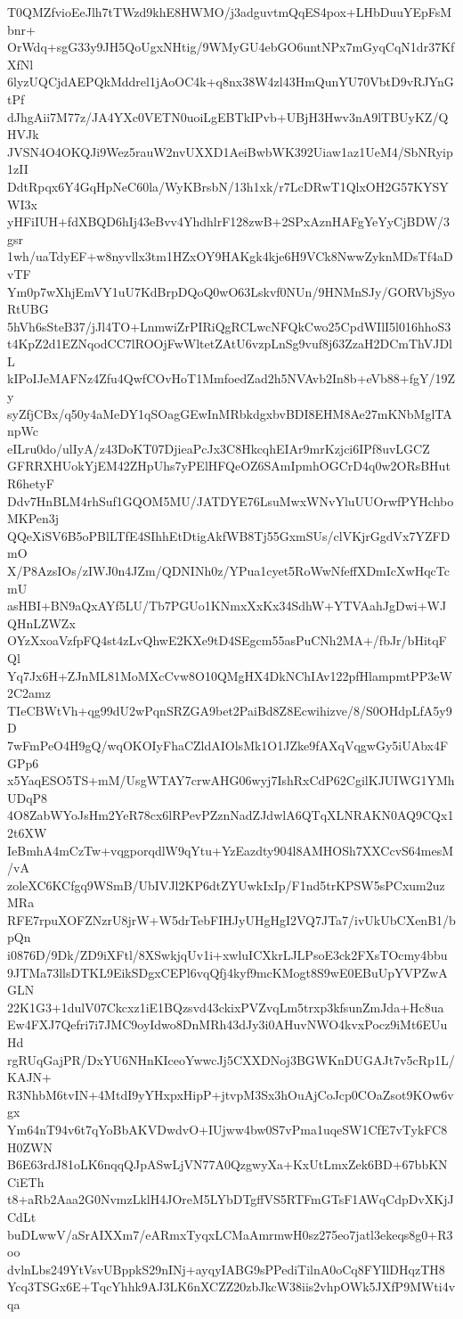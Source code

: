T0QMZfvioEeJlh7tTWzd9khE8HWMO/j3adguvtmQqES4pox+LHbDuuYEpFsMbnr+
OrWdq+sgG33y9JH5QoUgxNHtig/9WMyGU4ebGO6untNPx7mGyqCqN1dr37KfXfNl
6lyzUQCjdAEPQkMddrel1jAoOC4k+q8nx38W4zl43HmQunYU70VbtD9vRJYnGtPf
dJhgAii7M77z/JA4YXc0VETN0uoiLgEBTkIPvb+UBjH3Hwv3nA9lTBUyKZ/QHVJk
JVSN4O4OKQJi9Wez5rauW2nvUXXD1AeiBwbWK392Uiaw1az1UeM4/SbNRyip1zII
DdtRpqx6Y4GqHpNeC60la/WyKBrsbN/13h1xk/r7LcDRwT1QlxOH2G57KYSYWI3x
yHFiIUH+fdXBQD6hIj43eBvv4YhdhlrF128zwB+2SPxAznHAFgYeYyCjBDW/3gsr
1wh/uaTdyEF+w8nyvllx3tm1HZxOY9HAKgk4kje6H9VCk8NwwZyknMDsTf4aDvTF
Ym0p7wXhjEmVY1uU7KdBrpDQoQ0wO63Lskvf0NUn/9HNMnSJy/GORVbjSyoRtUBG
5hVh6sSteB37/jJl4TO+LnmwiZrPIRiQgRCLwcNFQkCwo25CpdWIlI5l016hhoS3
t4KpZ2d1EZNqodCC7lROOjFwWltetZAtU6vzpLnSg9vuf8j63ZzaH2DCmThVJDlL
kIPoIJeMAFNz4Zfu4QwfCOvHoT1MmfoedZad2h5NVAvb2In8b+eVb88+fgY/19Zy
syZfjCBx/q50y4aMeDY1qSOagGEwInMRbkdgxbvBDI8EHM8Ae27mKNbMglTAnpWc
eILru0do/ulIyA/z43DoKT07DjieaPcJx3C8HkcqhEIAr9mrKzjci6IPf8uvLGCZ
GFRRXHUokYjEM42ZHpUhs7yPElHFQeOZ6SAmIpmhOGCrD4q0w2ORsBHutR6hetyF
Ddv7HnBLM4rhSuf1GQOM5MU/JATDYE76LsuMwxWNvYluUUOrwfPYHchboMKPen3j
QQeXiSV6B5oPBlLTfE4SIhhEtDtigAkfWB8Tj55GxmSUs/clVKjrGgdVx7YZFDmO
X/P8AzsIOs/zIWJ0n4JZm/QDNINh0z/YPua1cyet5RoWwNfeffXDmIcXwHqcTcmU
asHBI+BN9aQxAYf5LU/Tb7PGUo1KNmxXxKx34SdhW+YTVAahJgDwi+WJQHnLZWZx
OYzXxoaVzfpFQ4st4zLvQhwE2KXe9tD4SEgcm55asPuCNh2MA+/fbJr/bHitqFQl
Yq7Jx6H+ZJnML81MoMXcCvw8O10QMgHX4DkNChIAv122pfHlampmtPP3eW2C2amz
TIeCBWtVh+qg99dU2wPqnSRZGA9bet2PaiBd8Z8Ecwihizve/8/S0OHdpLfA5y9D
7wFmPeO4H9gQ/wqOKOIyFhaCZldAIOlsMk1O1JZke9fAXqVqgwGy5iUAbx4FGPp6
x5YaqESO5TS+mM/UsgWTAY7crwAHG06wyj7IshRxCdP62CgilKJUIWG1YMhUDqP8
4O8ZabWYoJsHm2YeR78cx6lRPevPZznNadZJdwlA6QTqXLNRAKN0AQ9CQx12t6XW
IeBmhA4mCzTw+vqgporqdlW9qYtu+YzEazdty904l8AMHOSh7XXCcvS64mesM/vA
zoleXC6KCfgq9WSmB/UbIVJl2KP6dtZYUwkIxIp/F1nd5trKPSW5sPCxum2uzMRa
RFE7rpuXOFZNzrU8jrW+W5drTebFIHJyUHgHgI2VQ7JTa7/ivUkUbCXenB1/bpQn
i0876D/9Dk/ZD9iXFtl/8XSwkjqUv1i+xwluICXkrLJLPsoE3ck2FXsTOcmy4bbu
9JTMa73llsDTKL9EikSDgxCEPl6vqQfj4kyf9mcKMogt8S9wE0EBuUpYVPZwAGLN
22K1G3+1dulV07Ckcxz1iE1BQzsvd43ckixPVZvqLm5trxp3kfsunZmJda+Hc8ua
Ew4FXJ7Qefri7i7JMC9oyIdwo8DnMRh43dJy3i0AHuvNWO4kvxPocz9iMt6EUuHd
rgRUqGajPR/DxYU6NHnKIceoYwwcJj5CXXDNoj3BGWKnDUGAJt7v5cRp1L/KAJN+
R3NhbM6tvIN+4MtdI9yYHxpxHipP+jtvpM3Sx3hOuAjCoJcp0COaZsot9KOw6vgx
Ym64nT94v6t7qYoBbAKVDwdvO+IUjww4bw0S7vPma1uqeSW1CfE7vTykFC8H0ZWN
B6E63rdJ81oLK6nqqQJpASwLjVN77A0QzgwyXa+KxUtLmxZek6BD+67bbKNCiETh
t8+aRb2Aaa2G0NvmzLklH4JOreM5LYbDTgffVS5RTFmGTsF1AWqCdpDvXKjJCdLt
buDLwwV/aSrAIXXm7/eARmxTyqxLCMaAmrmwH0sz275eo7jatl3ekeqs8g0+R3oo
dvlnLbs249YtVsvUBppkS29nINj+ayqyIABG9sPPediTilnA0oCq8FYIlDHqzTH8
Ycq3TSGx6E+TqcYhhk9AJ3LK6nXCZZ20zbJkcW38iis2vhpOWk5JXfP9MWti4vqa

